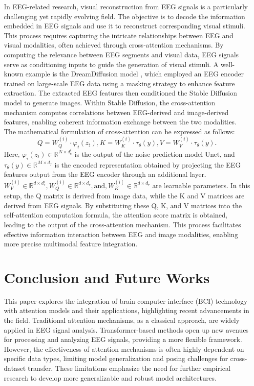 \documentclass[preprint,12pt]{elsarticle}
\begin{document}
In EEG-related research, visual reconstruction from EEG signals is a particularly challenging yet rapidly evolving field. The objective is to decode the information embedded in EEG signals and use it to reconstruct corresponding visual stimuli. This process requires capturing the intricate relationships between EEG and visual modalities, often achieved through cross-attention mechanisms. By computing the relevance between EEG segments and visual data, EEG signals serve as conditioning inputs to guide the generation of visual stimuli. A well-known example is the DreamDiffusion model \cite{bai2023dreamdiffusion}, which employed an EEG encoder trained on large-scale EEG data using a masking strategy to enhance feature extraction. The extracted EEG features then conditioned the Stable Diffusion model to generate images. Within Stable Diffusion, the cross-attention mechanism computes correlations between EEG-derived and image-derived features, enabling coherent information exchange between the two modalities. The mathematical formulation of cross-attention can be expressed as follows:
\begin{equation}
Q=W_{Q}^{(i)}\cdot\varphi_{i}\left(z_{t}\right),K=W_{K}^{(i)}\cdot\tau_{\theta}(y),V=W_{V}^{(i)}\cdot\tau_{\theta}(y).
\end{equation}
Here, $\varphi_i\left(z_t\right) \in \mathbb{R}^{N \times d_e^i}$ is the output of the noise prediction model Unet, and $\tau_{\theta}(y) \in \mathbb{R}^{M \times d_{\tau}}$ is the encoded representation obtained by projecting the EEG features output from the EEG encoder through an additional layer. $W_{V}^{(i)} \in \mathbb{R}^{d \times d_{\epsilon}^{i}}, W_{Q}^{(i)} \in \mathbb{R}^{d \times d_{\tau}}, \mathrm{and} , W_{K}^{(i)} \in \mathbb{R}^{d \times d_{\tau}}$ are learnable parameters. In this setup, the Q matrix is derived from image data, while the K and V matrices are derived from EEG signals. By substituting these Q, K, and V matrices into the self-attention computation formula, the attention score matrix is obtained, leading to the output of the cross-attention mechanism. This process facilitates effective information interaction between EEG and image modalities, enabling more precise multimodal feature integration.

\section{Conclusion and Future Works}
This paper explores the integration of brain-computer interface (BCI) technology with attention models and their applications, highlighting recent advancements in the field. Traditional attention mechanisms, as a classical approach, are widely applied in EEG signal analysis. Transformer-based methods open up new avenues for processing and analyzing EEG signals, providing a more flexible framework. However, the effectiveness of attention mechanisms is often highly dependent on specific data types, limiting model generalization and posing challenges for cross-dataset transfer. These limitations emphasize the need for further empirical research to develop more generalizable and robust model architectures.
\end{document}
